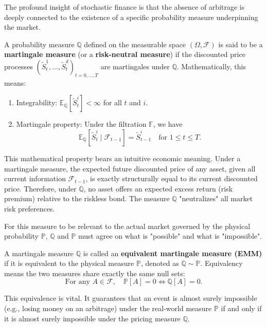 The profound insight of stochastic finance is that the absence of arbitrage is deeply connected to the existence of a specific probability measure underpinning the market.

\begin{definition}
A probability measure $\mathbb{Q}$ defined on the measurable space $(\Omega, \mathcal{F})$ is said to be a \textbf{martingale measure} (or a \textbf{risk-neutral measure}) if the discounted price processes $(\tilde{S}_t^1, \dots, \tilde{S}_t^d)_{t=0, \dots, T}$ are martingales under $\mathbb{Q}$. Mathematically, this means:
\begin{enumerate}
    \item Integrability: $\mathbb{E}_{\mathbb{Q}}[ \tilde{S}_t^i ] < \infty$ for all $t$ and $i$.
    \item Martingale property: Under the filtration $\mathbb{F}$, we have
    $$
    \mathbb{E}_{\mathbb{Q}}\left[ \tilde{S}_t^i \mid \mathcal{F}_{t-1} \right] = \tilde{S}_{t-1}^i \quad \text{for } 1 \leq t \leq T.
    $$
\end{enumerate}
\end{definition}

This mathematical property bears an intuitive economic meaning. Under a martingale measure, the expected future discounted price of any asset, given all current information $\mathcal{F}_{t-1}$, is exactly structurally equal to its current discounted price. Therefore, under $\mathbb{Q}$, no asset offers an expected excess return (risk premium) relative to the riskless bond. The measure $\mathbb{Q}$ "neutralizes" all market risk preferences.

For this measure to be relevant to the actual market governed by the physical probability $\mathbb{P}$, $\mathbb{Q}$ and $\mathbb{P}$ must agree on what is "possible" and what is "impossible".

\begin{definition}
A martingale measure $\mathbb{Q}$ is called an \textbf{equivalent martingale measure (EMM)} if it is equivalent to the physical measure $\mathbb{P}$, denoted as $\mathbb{Q} \sim \mathbb{P}$. Equivalency means the two measures share exactly the same null sets:
$$
\text{For any } A \in \mathcal{F}, \quad \mathbb{P}[A] = 0 \iff \mathbb{Q}[A] = 0.
$$
\end{definition}
This equivalence is vital. It guarantees that an event is almost surely impossible (e.g., losing money on an arbitrage) under the real-world measure $\mathbb{P}$ if and only if it is almost surely impossible under the pricing measure $\mathbb{Q}$.

